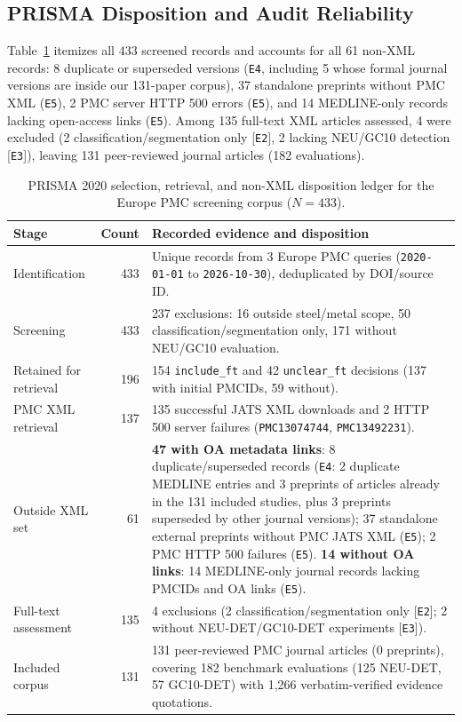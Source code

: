 \documentclass[pdflatex,sn-apa]{sn-jnl}
\begin{document}
\subsection{PRISMA Disposition and Audit Reliability}
Table~\ref{tab:prisma} itemizes all 433 screened records and accounts for all 61 non-XML records: 8 duplicate or superseded versions (\texttt{E4}, including 5 whose formal journal versions are inside our 131-paper corpus), 37 standalone preprints without PMC XML (\texttt{E5}), 2 PMC server HTTP 500 errors (\texttt{E5}), and 14 MEDLINE-only records lacking open-access links (\texttt{E5}). Among 135 full-text XML articles assessed, 4 were excluded (2 classification/segmentation only [\texttt{E2}], 2 lacking NEU/GC10 detection [\texttt{E3}]), leaving 131 peer-reviewed journal articles (182 evaluations).

\begin{table}[htbp]
\centering
\footnotesize
\setlength{\tabcolsep}{3.5pt}
\caption{PRISMA 2020 selection, retrieval, and non-XML disposition ledger for the Europe PMC screening corpus ($N=433$).}
\label{tab:prisma}
\begin{tabularx}{\textwidth}{>{\raggedright\arraybackslash}p{2.3cm} r X}
\toprule
\textbf{Stage} & \textbf{Count} & \textbf{Recorded evidence and disposition} \\
\midrule
Identification & 433 & Unique records from 3 Europe PMC queries (\texttt{2020-01-01} to \texttt{2026-10-30}), deduplicated by DOI/source ID. \\
Screening & 433 & 237 exclusions: 16 outside steel/metal scope, 50 classification/segmentation only, 171 without NEU/GC10 evaluation. \\
Retained for retrieval & 196 & 154 \texttt{include\_ft} and 42 \texttt{unclear\_ft} decisions (137 with initial PMCIDs, 59 without). \\
PMC XML retrieval & 137 & 135 successful JATS XML downloads and 2 HTTP 500 server failures (\texttt{PMC13074744}, \texttt{PMC13492231}). \\
Outside XML set & 61 & \textbf{47 with OA metadata links}: 8 duplicate/superseded records (\texttt{E4}: 2 duplicate MEDLINE entries and 3 preprints of articles already in the 131 included studies, plus 3 preprints superseded by other journal versions); 37 standalone external preprints without PMC JATS XML (\texttt{E5}); 2 PMC HTTP 500 failures (\texttt{E5}). \textbf{14 without OA links}: 14 MEDLINE-only journal records lacking PMCIDs and OA links (\texttt{E5}). \\
Full-text assessment & 135 & 4 exclusions (2 classification/segmentation only [\texttt{E2}]; 2 without NEU-DET/GC10-DET experiments [\texttt{E3}]). \\
Included corpus & 131 & 131 peer-reviewed PMC journal articles (0 preprints), covering 182 benchmark evaluations (125 NEU-DET, 57 GC10-DET) with 1,266 verbatim-verified evidence quotations. \\
\bottomrule
\end{tabularx}
\end{table}
\end{document}
